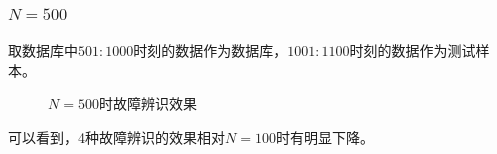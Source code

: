 \documentclass[lang=cn,11pt,a4paper]{elegantpaper}
\begin{document}
\subsubsection{$N = 500$}
取数据库中$501:1000$时刻的数据作为数据库，$1001:1100$时刻的数据作为测试样本。
\begin{figure}[H]
	\centering  %
	\caption{$N=500$时故障辨识效果}
	\label{Fig.main}
\end{figure}
可以看到，4种故障辨识的效果相对$N=100$时有明显下降。
\end{document}
